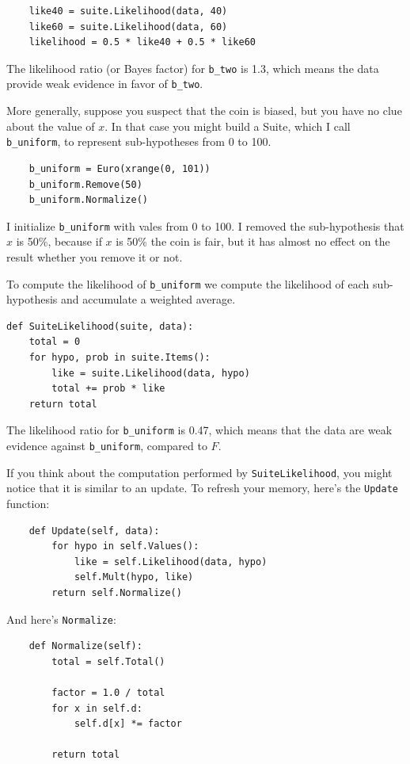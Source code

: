 \documentclass[12pt]{book}
\begin{document}
\begin{verbatim}
    like40 = suite.Likelihood(data, 40)
    like60 = suite.Likelihood(data, 60)
    likelihood = 0.5 * like40 + 0.5 * like60
\end{verbatim}

The likelihood ratio (or Bayes factor) for \verb"b_two" is 1.3, which
means the data provide weak evidence in favor of \verb"b_two".

More generally, suppose you suspect that the coin is biased, but you
have no clue about the value of $x$.  In that case you might build a
Suite, which I call \verb"b_uniform", to represent sub-hypotheses from
0 to 100.

\begin{verbatim}
    b_uniform = Euro(xrange(0, 101))
    b_uniform.Remove(50)
    b_uniform.Normalize()
\end{verbatim}

I initialize \verb"b_uniform" with vales from 0 to 100.
I removed the sub-hypothesis that $x$ is 50\%, because if
$x$ is 50\% the coin is fair, but it has almost no
effect on the result whether you remove it or not.

To compute the likelihood of
\verb"b_uniform" we compute the likelihood of each sub-hypothesis
and accumulate a weighted average.

\begin{verbatim}
def SuiteLikelihood(suite, data):
    total = 0
    for hypo, prob in suite.Items():
        like = suite.Likelihood(data, hypo)
        total += prob * like
    return total
\end{verbatim}

The likelihood ratio for \verb"b_uniform" is 0.47, which means
that the data are weak evidence against \verb"b_uniform",
compared to $F$.

If you think about the computation performed by
\verb"SuiteLikelihood", you might notice that it is similar to an
update.  To refresh your memory, here's the {\tt Update} function:

\begin{verbatim}
    def Update(self, data):
        for hypo in self.Values():
            like = self.Likelihood(data, hypo)
            self.Mult(hypo, like)
        return self.Normalize()
\end{verbatim}

And here's {\tt Normalize}:

\begin{verbatim}
    def Normalize(self):
        total = self.Total()
        
        factor = 1.0 / total
        for x in self.d:
            self.d[x] *= factor

        return total
\end{verbatim}
\end{document}
